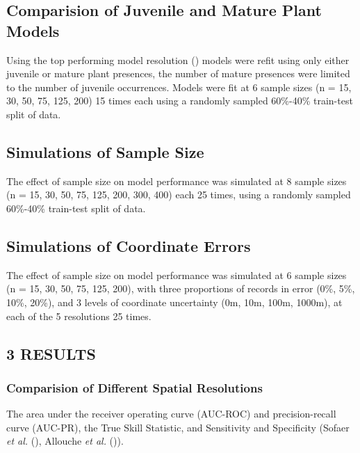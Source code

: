 \documentclass[
]{article}
\begin{document}
\subsection{Comparision of Juvenile and Mature Plant
Models}\label{comparision-of-juvenile-and-mature-plant-models}

Using the top performing model resolution () models were refit using
only either juvenile or mature plant presences, the number of mature
presences were limited to the number of juvenile occurrences. Models
were fit at 6 sample sizes (n = 15, 30, 50, 75, 125, 200) 15 times each
using a randomly sampled 60\%-40\% train-test split of data.

\subsection{Simulations of Sample
Size}\label{simulations-of-sample-size}

The effect of sample size on model performance was simulated at 8 sample
sizes (n = 15, 30, 50, 75, 125, 200, 300, 400) each 25 times, using a
randomly sampled 60\%-40\% train-test split of data.

\subsection{Simulations of Coordinate
Errors}\label{simulations-of-coordinate-errors}

The effect of sample size on model performance was simulated at 6 sample
sizes (n = 15, 30, 50, 75, 125, 200), with three proportions of records
in error (0\%, 5\%, 10\%, 20\%), and 3 levels of coordinate uncertainty
(0m, 10m, 100m, 1000m), at each of the 5 resolutions 25 times.

\subsection{3 \textbar{} RESULTS}\label{results}

\subsubsection{Comparision of Different Spatial
Resolutions}\label{comparision-of-different-spatial-resolutions-1}

The area under the receiver operating curve (AUC-ROC) and
precision-recall curve (AUC-PR), the True Skill Statistic, and
Sensitivity and Specificity (Sofaer \emph{et al.}
(), Allouche \emph{et al.}
()).
\end{document}
